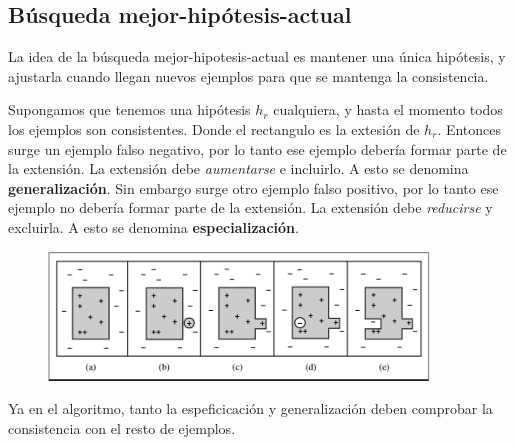 \documentclass[12 pt, a4paper]{article}
\begin{document}
		 \subsection{Búsqueda mejor-hipótesis-actual}
			La idea de la búsqueda mejor-hipotesis-actual es mantener una única hipótesis, y ajustarla cuando llegan nuevos ejemplos para que se mantenga la consistencia.
			
			Supongamos que tenemos una hipótesis \(h_{r}\) cualquiera, y hasta el momento todos los ejemplos son consistentes. Donde el rectangulo es la extesión de \(h_{r}\). Entonces surge un ejemplo falso negativo, por lo tanto ese ejemplo debería formar parte de la extensión. La extensión debe \emph{aumentarse} e incluirlo. A esto se denomina \textbf{generalización}. Sin embargo surge otro ejemplo falso positivo, por lo tanto ese ejemplo no debería formar parte de la extensión. La extensión debe \emph{reducirse} y excluirla. A esto se denomina \textbf{especialización}.
				\begin{figure}[h]
					\centering
					\includegraphics[width=0.9\textwidth]{SG.png}
				\end{figure}
			Ya en el algoritmo, tanto la espeficicación y generalización deben comprobar la consistencia con el resto de ejemplos.
			
\end{document}
